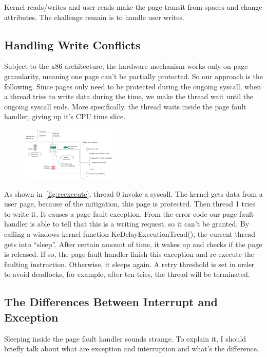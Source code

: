 Kernel reads/writes and user reads make the page transit from spaces and change attributes. The challenge remain is to handle user writes. 


\subsection{Handling Write Conflicts}
Subject to the x86 architecture, the hardware mechanism works only on page granularity, meaning one page can't be partially protected. So our approach is the following. Since pages only need to be protected during the ongoing syscall, when a thread tries to write data during the time, we make the thread wait until the ongoing syscall ends. More specifically, the thread waits inside the page fault handler, giving up it's CPU time slice. 

\begin{figure}[th]
  \includegraphics[width=0.40\textwidth]{figures/reexecute}
  \centering
  \caption{}
  \label{fig:reexecute}
\end{figure}


As shown in~\autoref{fig:reexecute}, thread 0 invoke a syscall. The kernel gets data from a user page, because of the mitigation, this page is protected. Then thread 1 tries to write it. It causes a page fault exception. From the error code our page fault handler is able to tell that this is a writing request, so it can't be granted. By calling a windows kernel function KeDelayExecutionTread(), the current thread gets into ``sleep''. After certain amount of time, it wakes up and checks if the page is released. If so, the page fault handler finish this exception and re-execute the faulting instruction. Otherwise, it sleeps again. A retry threshold is set in order to avoid deadlocks, for example, after ten tries, the thread will be terminated.  

\subsection{The Differences Between Interrupt and Exception}

Sleeping inside the page fault handler sounds strange. To explain it, I should briefly talk about what are exception and interruption and what's the difference.

